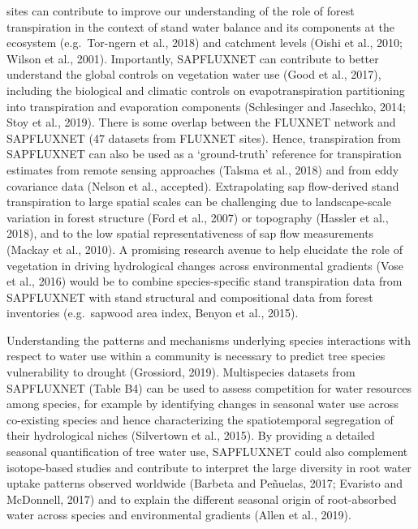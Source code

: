 \documentclass[11pt,twoside]{reedthesis}
\begin{document}
sites can contribute to improve our understanding of the role of forest
transpiration in the context of stand water balance and its components
at the ecosystem (e.g.~Tor-ngern et al., 2018) and catchment levels
(Oishi et al., 2010; Wilson et al., 2001). Importantly, SAPFLUXNET can
contribute to better understand the global controls on vegetation water
use (Good et al., 2017), including the biological and climatic controls
on evapotranspiration partitioning into transpiration and evaporation
components (Schlesinger and Jasechko, 2014; Stoy et al., 2019). There is
some overlap between the FLUXNET network and SAPFLUXNET (47 datasets
from FLUXNET sites). Hence, transpiration from SAPFLUXNET can also be
used as a `ground-truth' reference for transpiration estimates from
remote sensing approaches (Talsma et al., 2018) and from eddy covariance
data (Nelson et al., accepted). Extrapolating sap flow-derived stand
transpiration to large spatial scales can be challenging due to
landscape-scale variation in forest structure (Ford et al., 2007) or
topography (Hassler et al., 2018), and to the low spatial
representativeness of sap flow measurements (Mackay et al., 2010). A
promising research avenue to help elucidate the role of vegetation in
driving hydrological changes across environmental gradients (Vose et
al., 2016) would be to combine species-specific stand transpiration data
from SAPFLUXNET with stand structural and compositional data from forest
inventories (e.g.~sapwood area index, Benyon et al., 2015).\par

Understanding the patterns and mechanisms underlying species
interactions with respect to water use within a community is necessary
to predict tree species vulnerability to drought (Grossiord, 2019).
Multispecies datasets from SAPFLUXNET (Table B4) can be used to assess
competition for water resources among species, for example by
identifying changes in seasonal water use across co-existing species and
hence characterizing the spatiotemporal segregation of their
hydrological niches (Silvertown et al., 2015). By providing a detailed
seasonal quantification of tree water use, SAPFLUXNET could also
complement isotope-based studies and contribute to interpret the large
diversity in root water uptake patterns observed worldwide (Barbeta and
Peñuelas, 2017; Evaristo and McDonnell, 2017) and to explain the
different seasonal origin of root-absorbed water across species and
environmental gradients (Allen et al., 2019).\par
\end{document}
